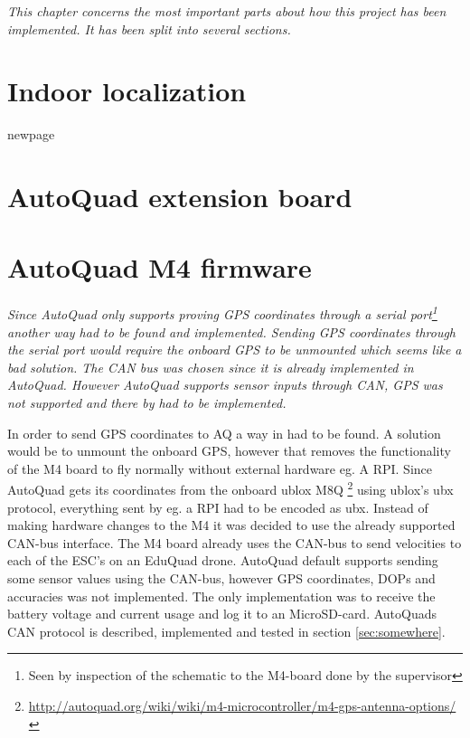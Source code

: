 \textit{This chapter concerns the most important parts about how this project has been implemented. It has been split into several sections.}

\section{Indoor localization}

newpage

\section{AutoQuad extension board}

\newpage

\section{AutoQuad M4 firmware}
\textit{Since AutoQuad only supports proving GPS coordinates through a serial port\footnote{Seen by inspection of the schematic to the M4-board done by the supervisor} another way had to be found and implemented.
Sending GPS coordinates through the serial port would require the onboard GPS to be unmounted which seems like a bad solution. The CAN bus was chosen since it is already implemented in AutoQuad. However AutoQuad supports sensor inputs through CAN, GPS was not supported and there by had to be implemented.}

In order to send GPS coordinates to AQ a way in had to be found. A solution would be to unmount the onboard GPS, however that removes the functionality of the M4 board to fly normally without external hardware eg. A RPI. Since AutoQuad gets its coordinates from the onboard ublox M8Q \footnote{\url{http://autoquad.org/wiki/wiki/m4-microcontroller/m4-gps-antenna-options/}} using ublox's ubx protocol, everything sent by eg. a RPI had to be encoded as ubx.
Instead of making hardware changes to the M4 it was decided to use the already supported CAN-bus interface. The M4 board already uses the CAN-bus to send velocities to each of the ESC's on an EduQuad drone. AutoQuad default supports sending some sensor values using the CAN-bus, however GPS coordinates, DOPs and accuracies was not implemented. The only implementation was to receive the battery voltage and current usage and log it to an MicroSD-card.
AutoQuads CAN protocol is described, implemented and tested in section \ref{sec:somewhere}.

